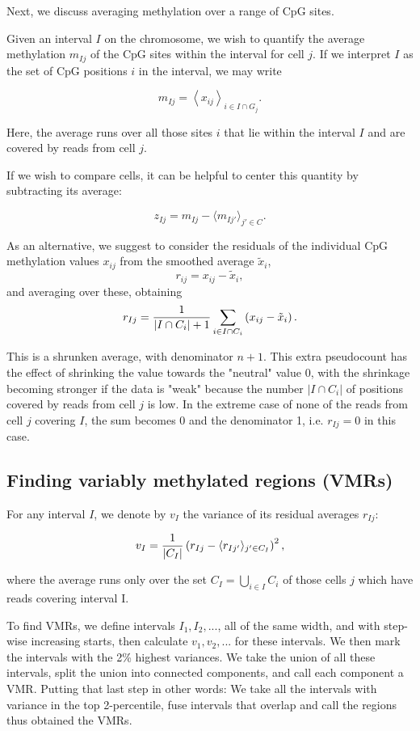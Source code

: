 \documentclass[twocolumn,10pt]{article}
\begin{document}
Next, we discuss averaging methylation over a range of CpG sites.

Given an interval $I$ on the chromosome, we wish to quantify the average methylation $m_{Ij}$ of the CpG sites within the interval for cell $j$. If we interpret $I$ as the set of CpG positions $i$ in the interval, we may write

$$ m_{Ij} = \left< x_{ij} \right>_{i\in I\cap G_j}.$$

Here, the average runs over all those sites $i$ that lie within the interval $I$ and are covered by reads from cell $j$.

If we wish to compare cells, it can be helpful to center this quantity by subtracting its average:

$$ z_{Ij} = m_{Ij} - \langle m_{Ij'}\rangle_{j'\in C}.$$

As an alternative, we suggest to consider the residuals of the individual CpG methylation values $x_{ij}$ from the smoothed average $\tilde x_i$,
$$ r_{ij} = x_{ij} - \tilde x_i, $$
and averaging over these, obtaining
\begin{equation} 
r_{Ij} = \frac{\scriptsize{1}}{\scriptsize{|I\cap C_i|+1}}\sum_{i\in I\cap C_i}\left( x_{ij} - \tilde x_i \right). \label{avgres}
\end{equation}

This is a shrunken average, with denominator $n+1$. This extra pseudocount has the effect of shrinking the value towards the "neutral" value 0, with the shrinkage becoming stronger if the data is "weak" because the number $|I\cap C_i|$ of positions covered by reads from cell $j$  is low. In the extreme case of none of the reads from cell $j$ covering $I$, the sum becomes 0 and the denominator 1, i.e. $r_{Ij}=0$ in this case.

\subsection{Finding variably methylated regions (VMRs)}

For any interval $I$, we denote by $v_I$ the variance of its residual averages $r_{Ij}$:

$$ v_I = \frac{\scriptsize{1}}{\scriptsize{|C_I|}}\left( r_{Ij} - \langle r_{Ij'}\rangle_{j'\in C_I} \right)^2,$$

where the average runs only over the set $C_I=\bigcup_{i\in I}C_i$ of those cells $j$ which have reads covering interval I.

To find VMRs, we define intervals $I_1, I_2, ...$, all of the same width, and with step-wise increasing starts, then calculate $v_1, v_2, ...$ for these intervals. We then mark the intervals with the 2\% highest variances. We take the union of all these intervals, split the union into connected components, and call each component a VMR. Putting that last step in other words: We take all the intervals with variance in the top 2-percentile, fuse intervals that overlap and call the regions thus obtained the VMRs.
\end{document}
